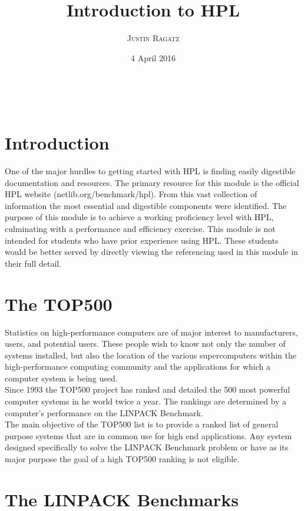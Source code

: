 \documentclass[a4paper, 11pt]{article}
\title{\textbf{Introduction to HPL}}
\author{\textsc{Justin Ragatz}}
\date{4 April 2016}
\makeatletter
\renewcommand{\maketitle}
{
	\begin{flushright}
	{\LARGE\@title}

	\vspace{20pt}

	{\large\@author}
	\\\@date
	\end{flushright}
}
\makeatother
\begin{document}
%
%
\maketitle
\bigskip

\section{Introduction}
One of the major hurdles to getting started with HPL is finding easily digestible documentation and resources. The primary resource for this module is the official HPL website (netlib.org/benchmark/hpl). From this vast collection of information the most essential and digestible components were identified. The purpose of this module is to achieve a working proficiency level with HPL, culminating with a performance and efficiency exercise. This module is not intended for students who have prior experience using HPL. These students would be better served by directly viewing the referencing used in this module in their full detail.

\section{The TOP500}

Statistics on high-performance computers are of major interest to manufacturers, users, and potential users. These people wish to know not only the number of systems installed, but also the location of the various supercomputers within the high-performance computing community and the applications for which a computer system is being used.\cite{website:top} \\

Since 1993 the TOP500 project has ranked and detailed the 500 most powerful computer systems in he world twice a year. The rankings are determined by a computer's performance on the LINPACK Benchmark. \\

The main objective of the TOP500 list is to provide a ranked list of general purpose systems that are in common use for high end applications. Any system designed specifically to solve the LINPACK Benchmark problem or have as its major purpose the goal of a high TOP500 ranking is not eligible.

\section{The LINPACK Benchmarks}
\end{document}
